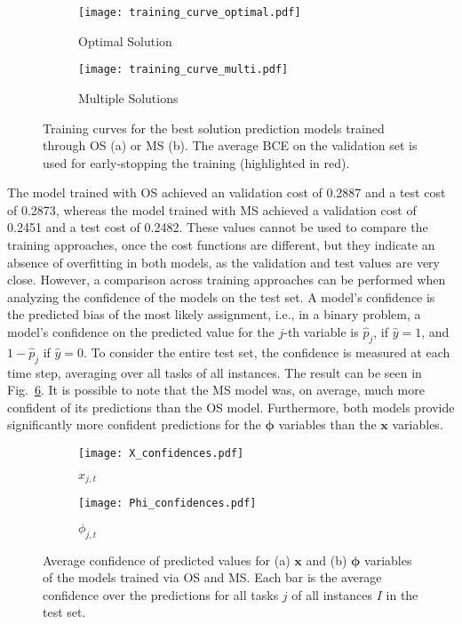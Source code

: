 \begin{figure}
    \centering
    \begin{subfigure}{0.49\textwidth}
        \centering
        \texttt{[image: training\_curve\_optimal.pdf]}
        \caption{Optimal Solution}\label{fig:training-bs}
    \end{subfigure}
    \begin{subfigure}{0.49\textwidth}
        \centering
        \texttt{[image: training\_curve\_multi.pdf]}
        \caption{Multiple Solutions}\label{fig:training-ms}
    \end{subfigure}
    \caption{Training curves for the best solution prediction models trained through OS (a) or MS (b). The average BCE on the validation set is used for early-stopping the training (highlighted in red).}
    \label{fig:opt-training-curves}
\end{figure}

The model trained with OS achieved an validation cost of 0.2887 and a test cost of 0.2873, whereas the model trained with MS achieved a validation cost of 0.2451 and a test cost of 0.2482.
These values cannot be used to compare the training approaches, once the cost functions are different, but they indicate an absence of overfitting in both models, as the validation and test values are very close.
However, a comparison across training approaches can be performed when analyzing the confidence of the models on the test set.
A model's confidence is the predicted bias of the most likely assignment, i.e., in a binary problem, a model's confidence on the predicted value for the $j$-th variable is $\hat{p}_j$, if $\hat{y} = 1$, and $1-\hat{p}_j$ if $\hat{y}=0$.
To consider the entire test set, the confidence is measured at each time step, averaging over all tasks of all instances.
The result can be seen in Fig.~\ref{fig:prediction-confidences}.
It is possible to note that the MS model was, on average, much more confident of its predictions than the OS model.
Furthermore, both models provide significantly more confident predictions for the $\bm{\phi}$ variables than the $\bm{x}$ variables.

\begin{figure}[h]
    \centering
    \begin{subfigure}{0.49\textwidth}
        \centering
        \texttt{[image: X\_confidences.pdf]}
        \caption{$x_{j,t}$}\label{fig:conf-x}
    \end{subfigure}
    \begin{subfigure}{0.49\textwidth}
        \centering
        \texttt{[image: Phi\_confidences.pdf]}
        \caption{$\phi_{j,t}$}\label{fig:conf-phi}
    \end{subfigure}
    \caption{Average confidence of predicted values for (a) $\bm{x}$ and (b) $\bm{\phi}$ variables of the models trained via OS and MS. Each bar is the average confidence over the predictions for all tasks $j$ of all instances $I$ in the test set.}
    \label{fig:prediction-confidences}
\end{figure}

